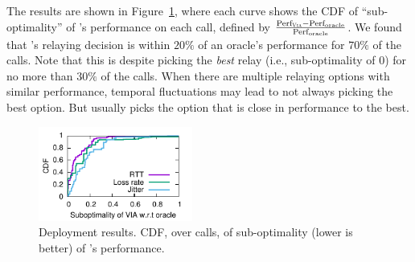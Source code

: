 The results are shown in Figure~\ref{fig:real-world}, where each curve shows the CDF of ``sub-optimality'' of \hybrid's performance on each call, defined by $\frac{\text{Perf}_{\textsc{Via}}-\text{Perf}_{\text{oracle}}}{\text{Perf}_{\text{oracle}}}$.
We found that {\hybrid}'s relaying decision is within $20\%$ of an oracle's performance for $70\%$ of the calls. Note that this is despite picking the {\em best} relay (i.e., sub-optimality of $0$) for no more than $30\%$ of the calls. When there are multiple relaying options with similar performance, temporal fluctuations may lead to not always picking the best option. But \hybrid usually picks the option that is close in performance to the best.


\begin{figure}[t!]
\centering
\includegraphics[width=0.45\textwidth]{figures/Via-Rajdeep-active-exp-CDF.pdf}
\caption{Deployment results. CDF, over calls, of sub-optimality (lower is better) of \hybrid's performance.}
\label{fig:real-world}
\end{figure}


